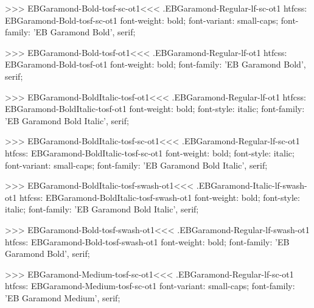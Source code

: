 {{{{{{{>>>
\<EBGaramond-Bold-tosf-sc-ot1\><<<
.EBGaramond-Regular-lf-sc-ot1
htfcss:  EBGaramond-Bold-tosf-sc-ot1  font-weight: bold; font-variant: small-caps; font-family: 'EB Garamond Bold', serif;

>>>
\<EBGaramond-Bold-tosf-ot1\><<<
.EBGaramond-Regular-lf-ot1
htfcss:  EBGaramond-Bold-tosf-ot1  font-weight: bold; font-family: 'EB Garamond Bold', serif;

>>>
\<EBGaramond-BoldItalic-tosf-ot1\><<<
.EBGaramond-Regular-lf-ot1
htfcss:  EBGaramond-BoldItalic-tosf-ot1  font-weight: bold; font-style: italic; font-family: 'EB Garamond Bold Italic', serif;

>>>
\<EBGaramond-BoldItalic-tosf-sc-ot1\><<<
.EBGaramond-Regular-lf-sc-ot1
htfcss:  EBGaramond-BoldItalic-tosf-sc-ot1  font-weight: bold; font-style: italic; font-variant: small-caps; font-family: 'EB Garamond Bold Italic', serif;

>>>
\<EBGaramond-BoldItalic-tosf-swash-ot1\><<<
.EBGaramond-Italic-lf-swash-ot1
htfcss:  EBGaramond-BoldItalic-tosf-swash-ot1  font-weight: bold; font-style: italic; font-family: 'EB Garamond Bold Italic', serif;

>>>
\<EBGaramond-Bold-tosf-swash-ot1\><<<
.EBGaramond-Regular-lf-swash-ot1
htfcss:  EBGaramond-Bold-tosf-swash-ot1  font-weight: bold; font-family: 'EB Garamond Bold', serif;

>>>
\<EBGaramond-Medium-tosf-sc-ot1\><<<
.EBGaramond-Regular-lf-sc-ot1
htfcss:  EBGaramond-Medium-tosf-sc-ot1  font-variant: small-caps; font-family: 'EB Garamond Medium', serif;

}}}}}}}

